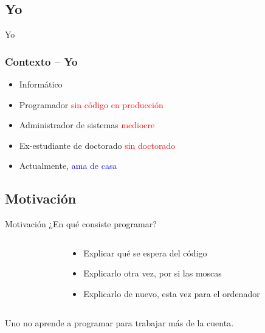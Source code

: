 \documentclass[xcolor=x11names,compress]{beamer}
\renewcommand{\(}{\begin{columns}}
\renewcommand{\)}{\end{columns}}
\newcommand{\<}[1]{\begin{column}{#1}}
\renewcommand{\>}{\end{column}}
\begin{document}
\subsection{Yo}
\begin{frame}{Yo}
    \frametitle{Contexto -- Yo}
    \begin{itemize}
        \item Informático \pause
        \item Programador \textcolor{red}{sin código en producción} \pause
        \item Administrador de sistemas \textcolor{red}{mediocre} \pause
        \item Ex-estudiante de doctorado \textcolor{red}{sin doctorado} \pause
        \item Actualmente, \textcolor{blue}{ama de casa}
    \end{itemize}
\end{frame}

\subsection{Motivación}
\begin{frame}{Motivación}
    ¿En qué consiste programar?
    \begin{columns}
        \begin{column}{.5\linewidth}
        \begin{block}
            \codeFactorial
        \end{block}
        \end{column}
        \begin{column}{.5\linewidth}
            \begin{itemize}\itemsep25pt \pause
                \item Explicar qué se espera del código\pause
                \item Explicarlo otra vez, por si las moscas\pause
                \item Explicarlo de nuevo, esta vez para el ordenador\pause
            \end{itemize}
        \end{column}
    \end{columns}
    Uno no aprende a programar para trabajar más de la cuenta.
\end{frame}

\end{document}
